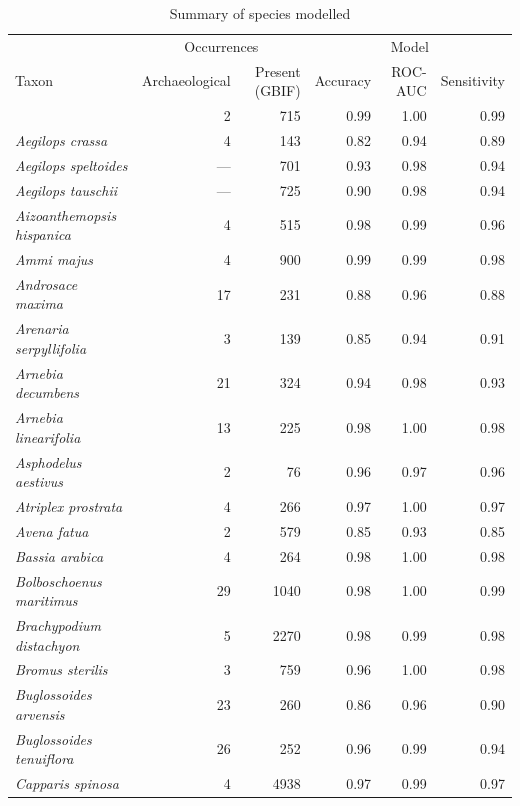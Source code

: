 \documentclass[
  authoryear,
  preprint]{elsarticle}
\begin{document}
\begin{longtable}{@{\extracolsep{\fill}}lrrrrr}

\caption{\label{tbl-taxa}Summary of species modelled}

\tabularnewline

\toprule
 & \multicolumn{2}{c}{Occurrences} & \multicolumn{3}{c}{Model} \\ 
\cmidrule(lr){2-3} \cmidrule(lr){4-6}
Taxon & Archaeological & Present (GBIF) & Accuracy & ROC-AUC & Sensitivity \\ 
\midrule\addlinespace[2.5pt]
{\itshape Adonis dentata} & 2 & 715 & 0.99 & 1.00 & 0.99 \\ 
{\itshape Aegilops crassa} & 4 & 143 & 0.82 & 0.94 & 0.89 \\ 
{\itshape Aegilops speltoides} & — & 701 & 0.93 & 0.98 & 0.94 \\ 
{\itshape Aegilops tauschii} & — & 725 & 0.90 & 0.98 & 0.94 \\ 
{\itshape Aizoanthemopsis hispanica} & 4 & 515 & 0.98 & 0.99 & 0.96 \\ 
{\itshape Ammi majus} & 4 & 900 & 0.99 & 0.99 & 0.98 \\ 
{\itshape Androsace maxima} & 17 & 231 & 0.88 & 0.96 & 0.88 \\ 
{\itshape Arenaria serpyllifolia} & 3 & 139 & 0.85 & 0.94 & 0.91 \\ 
{\itshape Arnebia decumbens} & 21 & 324 & 0.94 & 0.98 & 0.93 \\ 
{\itshape Arnebia linearifolia} & 13 & 225 & 0.98 & 1.00 & 0.98 \\ 
{\itshape Asphodelus aestivus} & 2 & 76 & 0.96 & 0.97 & 0.96 \\ 
{\itshape Atriplex prostrata} & 4 & 266 & 0.97 & 1.00 & 0.97 \\ 
{\itshape Avena fatua} & 2 & 579 & 0.85 & 0.93 & 0.85 \\ 
{\itshape Bassia arabica} & 4 & 264 & 0.98 & 1.00 & 0.98 \\ 
{\itshape Bolboschoenus maritimus} & 29 & 1040 & 0.98 & 1.00 & 0.99 \\ 
{\itshape Brachypodium distachyon} & 5 & 2270 & 0.98 & 0.99 & 0.98 \\ 
{\itshape Bromus sterilis} & 3 & 759 & 0.96 & 1.00 & 0.98 \\ 
{\itshape Buglossoides arvensis} & 23 & 260 & 0.86 & 0.96 & 0.90 \\ 
{\itshape Buglossoides tenuiflora} & 26 & 252 & 0.96 & 0.99 & 0.94 \\ 
{\itshape Capparis spinosa} & 4 & 4938 & 0.97 & 0.99 & 0.97 \\ 

\end{longtable}
\end{document}
